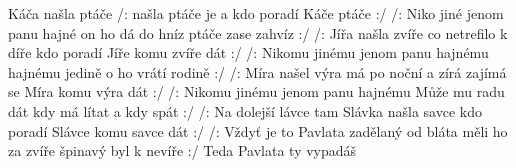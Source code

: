 \begin{TEXT}{Káča našla ptáče}
\SLOKA /:  našla ptáče je  a 
kdo poradí Káče  ptáče  :/
/: Niko jiné jenom panu hajné
on ho dá do hníz ptáče zase zahvíz :/
\SLOKA /: Jířa našla zvíře co netrefilo k díře
kdo poradí Jíře komu zvíře dát :/
/: Nikomu jinému jenom panu hajnému 
hajnému jedině o ho vrátí rodině :/
\SLOKA /: Míra našel výra má po noční a zírá
zajímá se Míra komu výra dát :/
/: Nikomu jinému jenom panu hajnému 
Může mu radu dát kdy má lítat a kdy spát :/
\SLOKA /: Na dolejší lávce tam Slávka našla savce
kdo poradí Slávce komu savce dát :/
/: Vždyť je to Pavlata zadělaný od bláta
měli ho za zvíře špinavý byl k nevíře :/
\INTERM Teda Pavlata ty vypadáš
\end{TEXT}